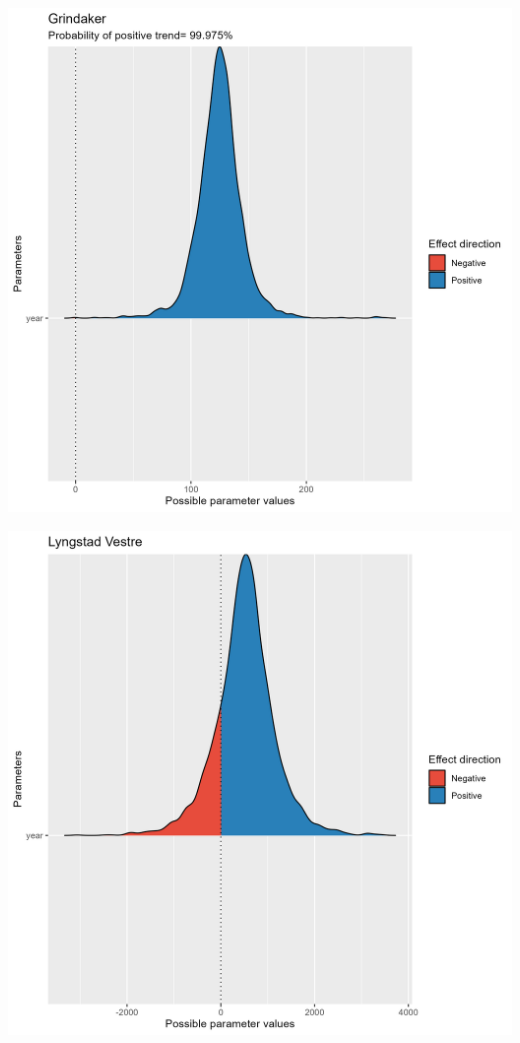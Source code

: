 \documentclass[
  letterpaper,
  DIV=11,
  numbers=noendperiod]{scrreport}
\begin{document}
\includegraphics{data/derived_data/direction_plots/plots/Grindaker.png}

\includegraphics{data/derived_data/direction_plots/plots/Lyngstad_Vestre.png}
\end{document}
